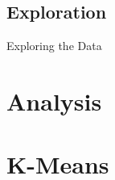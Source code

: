 \documentclass[11pt]{beamer}
\begin{document}
\subsection{Exploration}
\begin{frame}{Exploring the Data}
\begin{center}
\end{center}
\end{frame}

\section{Analysis}


\section{K-Means}
\end{document}
